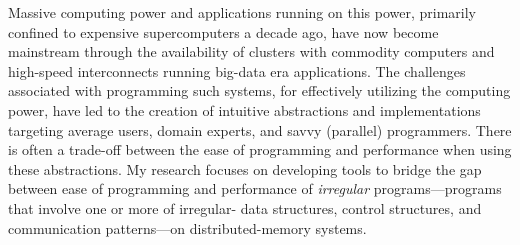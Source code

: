 Massive computing power and applications running on this power, primarily confined to expensive supercomputers a decade ago, have now become mainstream through the availability of clusters with commodity computers and high-speed interconnects running big-data era applications. 
The challenges associated with programming such systems, for effectively utilizing the computing power, have led to the creation of intuitive abstractions and implementations targeting average users, domain experts, and savvy (parallel) programmers. 
There is often a trade-off between the ease of programming and performance when using these abstractions. 
My research focuses on developing tools to bridge the gap between ease of programming and performance of {\em irregular} programs---programs that involve one or more of irregular- data structures, control structures, and communication patterns---on distributed-memory systems. 

